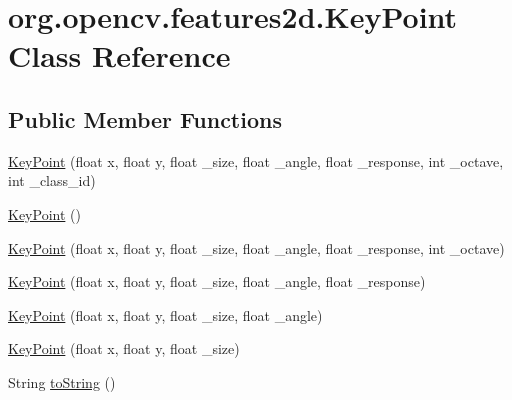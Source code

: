\hypertarget{classorg_1_1opencv_1_1features2d_1_1_key_point}{}\section{org.\+opencv.\+features2d.\+Key\+Point Class Reference}
\label{classorg_1_1opencv_1_1features2d_1_1_key_point}
\subsection*{Public Member Functions}
\begin{DoxyCompactItemize}
\item 
\mbox{\hyperlink{classorg_1_1opencv_1_1features2d_1_1_key_point_ab881124337e7ed8f8901941a93480b3e}{Key\+Point}} (float x, float y, float \+\_\+size, float \+\_\+angle, float \+\_\+response, int \+\_\+octave, int \+\_\+class\+\_\+id)
\item 
\mbox{\hyperlink{classorg_1_1opencv_1_1features2d_1_1_key_point_a39069c7576099d221fc93f6ab772d7b3}{Key\+Point}} ()
\item 
\mbox{\hyperlink{classorg_1_1opencv_1_1features2d_1_1_key_point_ac2dbc2add9b446a669e9cc2772786437}{Key\+Point}} (float x, float y, float \+\_\+size, float \+\_\+angle, float \+\_\+response, int \+\_\+octave)
\item 
\mbox{\hyperlink{classorg_1_1opencv_1_1features2d_1_1_key_point_a5c15743886f15eb89338d4303231eea6}{Key\+Point}} (float x, float y, float \+\_\+size, float \+\_\+angle, float \+\_\+response)
\item 
\mbox{\hyperlink{classorg_1_1opencv_1_1features2d_1_1_key_point_a576359f028d9203d944f74c72d1c57c0}{Key\+Point}} (float x, float y, float \+\_\+size, float \+\_\+angle)
\item 
\mbox{\hyperlink{classorg_1_1opencv_1_1features2d_1_1_key_point_a962b7142aae6bd95afcb6c9188b67668}{Key\+Point}} (float x, float y, float \+\_\+size)
\item 
String \mbox{\hyperlink{classorg_1_1opencv_1_1features2d_1_1_key_point_a2326d3eaa541219cf29f60b734910ba3}{to\+String}} ()
\end{DoxyCompactItemize}
